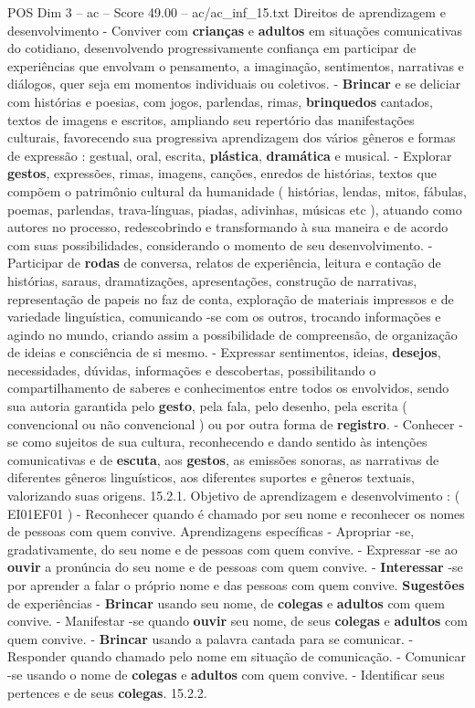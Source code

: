 \begin{textsample}{POS Dim 3 – ac – Score 49.00 – ac/ac\_inf\_15.txt}
Direitos de aprendizagem e desenvolvimento - Conviver com \textbf{crianças} e \textbf{adultos} em situações comunicativas do cotidiano, desenvolvendo progressivamente confiança em participar de experiências que envolvam o pensamento, a imaginação, sentimentos, narrativas e diálogos, quer seja em momentos individuais ou coletivos. - \textbf{Brincar} e se deliciar com histórias e poesias, com jogos, parlendas, rimas, \textbf{brinquedos} cantados, textos de imagens e escritos, ampliando seu repertório das manifestações culturais, favorecendo sua progressiva aprendizagem dos vários gêneros e formas de expressão : gestual, oral, escrita, \textbf{plástica}, \textbf{dramática} e musical. - Explorar \textbf{gestos}, expressões, rimas, imagens, canções, enredos de histórias, textos que compõem o patrimônio cultural da humanidade ( histórias, lendas, mitos, fábulas, poemas, parlendas, trava-línguas, piadas, adivinhas, músicas etc ), atuando como autores no processo, redescobrindo e transformando à sua maneira e de acordo com suas possibilidades, considerando o momento de seu desenvolvimento. - Participar de \textbf{rodas} de conversa, relatos de experiência, leitura e contação de histórias, saraus, dramatizações, apresentações, construção de narrativas, representação de papeis no faz de conta, exploração de materiais impressos e de variedade linguística, comunicando -se com os outros, trocando informações e agindo no mundo, criando assim a possibilidade de compreensão, de organização de ideias e consciência de si mesmo. - Expressar sentimentos, ideias, \textbf{desejos}, necessidades, dúvidas, informações e descobertas, possibilitando o compartilhamento de saberes e conhecimentos entre todos os envolvidos, sendo sua autoria garantida pelo \textbf{gesto}, pela fala, pelo desenho, pela escrita ( convencional ou não convencional ) ou por outra forma de \textbf{registro}. - Conhecer -se como sujeitos de sua cultura, reconhecendo e dando sentido às intenções comunicativas e de \textbf{escuta}, aos \textbf{gestos}, as emissões sonoras, as narrativas de diferentes gêneros linguísticos, aos diferentes suportes e gêneros textuais, valorizando suas origens. 15.2.1.
Objetivo de aprendizagem e desenvolvimento : ( EI01EF01 ) - Reconhecer quando é chamado por seu nome e reconhecer os nomes de pessoas com quem convive.
Aprendizagens específicas - Apropriar -se, gradativamente, do seu nome e de pessoas com quem convive. - Expressar -se ao \textbf{ouvir} a pronúncia do seu nome e de pessoas com quem convive. - \textbf{Interessar} -se por aprender a falar o próprio nome e das pessoas com quem convive. \textbf{Sugestões} de experiências - \textbf{Brincar} usando seu nome, de \textbf{colegas} e \textbf{adultos} com quem convive. - Manifestar -se quando \textbf{ouvir} seu nome, de seus \textbf{colegas} e \textbf{adultos} com quem convive. - \textbf{Brincar} usando a palavra cantada para se comunicar. - Responder quando chamado pelo nome em situação de comunicação. - Comunicar -se usando o nome de \textbf{colegas} e \textbf{adultos} com quem convive. - Identificar seus pertences e de seus \textbf{colegas}. 15.2.2.

\end{textsample}

